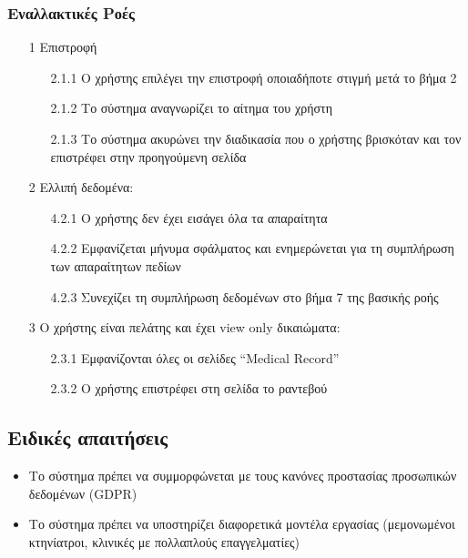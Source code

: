 \documentclass[12pt,a4paper,twoside]{book}
\begin{document}
\subsubsection{Εναλλακτικές Ροές}
\begin{enumerate}
  \item[1 ] Επιστροφή
        \begin{enumerate}
          \item[2.1.1 ] Ο χρήστης επιλέγει την επιστροφή οποιαδήποτε στιγμή μετά το βήμα 2 %
          \item[2.1.2 ] Το σύστημα αναγνωρίζει το αίτημα του χρήστη %
          \item[2.1.3 ] Το σύστημα ακυρώνει την διαδικασία που ο χρήστης βρισκόταν και τον επιστρέφει στην προηγούμενη σελίδα %
        \end{enumerate}
  \item[2 ] Ελλιπή δεδομένα:  %
        \begin{enumerate}
          \item[4.2.1 ] Ο χρήστης δεν έχει εισάγει όλα τα απαραίτητα  %
          \item[4.2.2 ] Εμφανίζεται μήνυμα σφάλματος και ενημερώνεται για τη συμπλήρωση των απαραίτητων πεδίων %
          \item[4.2.3 ] Συνεχίζει τη συμπλήρωση δεδομένων στο βήμα 7 της βασικής ροής %
        \end{enumerate}
  \item[3 ] Ο χρήστης είναι πελάτης και έχει view only δικαιώματα:  %
        \begin{enumerate}
          \item[2.3.1 ] Εμφανίζονται όλες οι σελίδες “Medical Record” %
          \item[2.3.2 ] Ο χρήστης επιστρέφει στη σελίδα το ραντεβού  %
        \end{enumerate}
\end{enumerate}

\subsection{Ειδικές απαιτήσεις} %
\begin{itemize}
  \item Το σύστημα πρέπει να συμμορφώνεται με τους κανόνες προστασίας προσωπικών δεδομένων (GDPR)  %
  \item Το σύστημα πρέπει να υποστηρίζει διαφορετικά μοντέλα εργασίας (μεμονωμένοι κτηνίατροι, κλινικές με πολλαπλούς επαγγελματίες)  %
\end{itemize}
\end{document}
